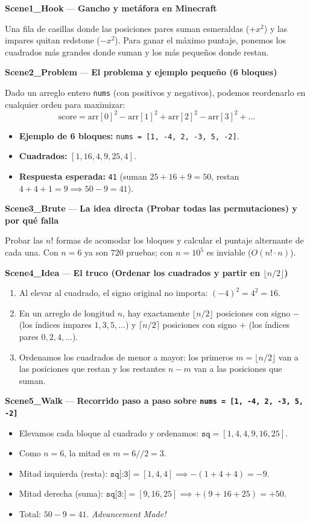 \documentclass[letterpaper,10pt]{article}
\newcommand{\scene}[2]{\noindent\textbf{\textcolor{mcaqua}{#1}} --- \textbf{#2}\par\vspace{1pt}}
\begin{document}
\begin{shaded}
\scene{Scene1\_Hook}{Gancho y met\'afora en Minecraft}
Una fila de casillas donde las posiciones pares suman esmeraldas ($+x^2$) y las impares quitan redstone ($-x^2$). Para ganar el m\'aximo puntaje, ponemos los cuadrados m\'as grandes donde suman y los m\'as peque\~nos donde restan.

\scene{Scene2\_Problem}{El problema y ejemplo peque\~no (6 bloques)}
Dado un arreglo entero \texttt{nums} (con positivos y negativos), podemos reordenarlo en cualquier orden para maximizar:
$$\text{score} = \text{arr}[0]^2 - \text{arr}[1]^2 + \text{arr}[2]^2 - \text{arr}[3]^2 + \dots$$
\begin{itemize}\setlength{\itemsep}{1pt}
  \item \textbf{Ejemplo de 6 bloques:} \texttt{nums = [1, -4, 2, -3, 5, -2]}.
  \item \textbf{Cuadrados:} $[1, 16, 4, 9, 25, 4]$.
  \item \textbf{Respuesta esperada:} \texttt{41} (suman $25 + 16 + 9 = 50$, restan $4 + 4 + 1 = 9 \implies 50 - 9 = 41$).
\end{itemize}

\scene{Scene3\_Brute}{La idea directa (Probar todas las permutaciones) y por qu\'e falla}
Probar las $n!$ formas de acomodar los bloques y calcular el puntaje alternante de cada una. Con $n = 6$ ya son $720$ pruebas; con $n = 10^5$ es inviable ($O(n! \cdot n)$).

\scene{Scene4\_Idea}{El truco (Ordenar los cuadrados y partir en $\lfloor n/2 \rfloor$)}
\begin{enumerate}\setlength{\itemsep}{1pt}
  \item Al elevar al cuadrado, el signo original no importa: $(-4)^2 = 4^2 = 16$.
  \item En un arreglo de longitud $n$, hay exactamente $\lfloor n/2 \rfloor$ posiciones con signo $-$ (los \'indices impares $1, 3, 5, \dots$) y $\lceil n/2 \rceil$ posiciones con signo $+$ (los \'indices pares $0, 2, 4, \dots$).
  \item Ordenamos los cuadrados de menor a mayor: los primeros $m = \lfloor n/2 \rfloor$ van a las posiciones que restan y los restantes $n - m$ van a las posiciones que suman.
\end{enumerate}

\scene{Scene5\_Walk}{Recorrido paso a paso sobre \texttt{nums = [1, -4, 2, -3, 5, -2]}}
\begin{itemize}\setlength{\itemsep}{1pt}
  \item Elevamos cada bloque al cuadrado y ordenamos: $\texttt{sq} = [1, 4, 4, 9, 16, 25]$.
  \item Como $n = 6$, la mitad es $m = 6 // 2 = 3$.
  \item Mitad izquierda (resta): $\texttt{sq[:3]} = [1, 4, 4] \implies -(1 + 4 + 4) = -9$.
  \item Mitad derecha (suma): $\texttt{sq[3:]} = [9, 16, 25] \implies +(9 + 16 + 25) = +50$.
  \item Total: $50 - 9 = 41$. \textit{Advancement Made!}
\end{itemize}


\end{shaded}
\end{document}
